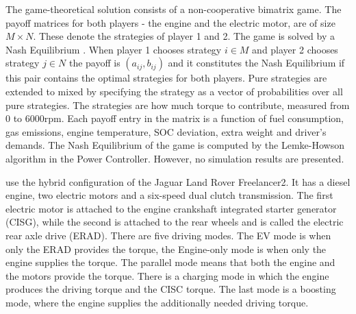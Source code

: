 The game-theoretical solution consists of a non-cooperative bimatrix game. The payoff matrices for both players - the engine and the electric motor, are of size $M \times N$. These denote the strategies of player 1 and 2. The game is solved by a Nash Equilibrium \citep{nash1951non}. When player 1 chooses strategy $i \in M$ and player 2 chooses strategy $j \in N$ the payoff is $(a_{ij},b_{ij})$ and it constitutes the Nash Equilibrium if this pair contains the optimal strategies for both players. Pure strategies are extended to mixed by specifying the strategy as a vector of probabilities over all pure strategies. The strategies are how much torque to contribute, measured from 0 to 6000rpm. Each payoff entry in the matrix is a function of fuel consumption, gas emissions, engine temperature, SOC deviation, extra weight and driver's demands. The Nash Equilibrium of the game is computed by the Lemke-Howson algorithm \citep{lemke1964equilibrium} in the Power Controller. However, no simulation results are presented.


\citet{dextreit2014game} use the hybrid configuration of the Jaguar Land Rover Freelancer2. It has a diesel engine, two electric motors and a six-speed dual clutch transmission. The first electric motor is attached to the engine crankshaft integrated starter generator (CISG), while the second is attached to the rear wheels and is called the electric rear axle drive (ERAD). There are five driving modes. The EV mode is when only the ERAD provides the torque, the Engine-only mode is when only the engine supplies the torque. The parallel mode means that both the engine and the motors provide the torque. There is a charging mode in which the engine produces the driving torque and the CISC torque. The last mode is a boosting mode, where the engine supplies the additionally needed driving torque.


